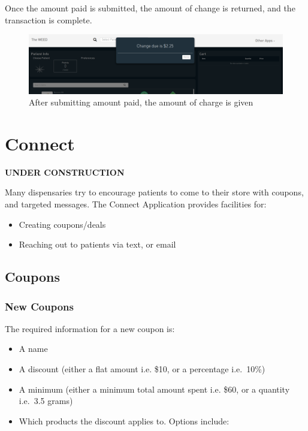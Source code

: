 \documentclass[]{book}
\theoremstyle{definition}
\theoremstyle{definition}
\theoremstyle{definition}
\theoremstyle{remark}
\begin{document}
Once the amount paid is submitted, the amount of change is returned, and
the transaction is complete.

\begin{figure}
\centering
\includegraphics{images/P11.png}
\caption{After submitting amount paid, the amount of charge is given}
\end{figure}

\chapter{Connect}\label{connect}

\textbf{UNDER CONSTRUCTION}

Many dispensaries try to encourage patients to come to their store with
coupons, and targeted messages. The Connect Application provides
facilities for:

\begin{itemize}
\item
  Creating coupons/deals
\item
  Reaching out to patients via text, or email
\end{itemize}

\section{Coupons}\label{coupons}

\subsection{New Coupons}\label{new-coupons}

The required information for a new coupon is:

\begin{itemize}
\item
  A name
\item
  A discount (either a flat amount i.e. \$10, or a percentage i.e.~10\%)
\item
  A minimum (either a minimum total amount spent i.e. \$60, or a
  quantity i.e.~3.5 grams)
\item
  Which products the discount applies to. Options include:
\end{itemize}
\end{document}
